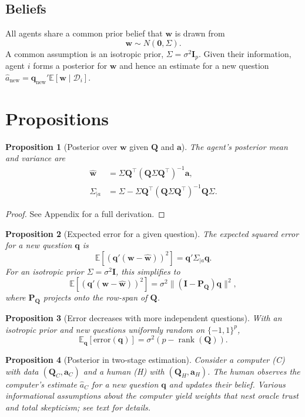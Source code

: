\documentclass[11pt]{article}
\newtheorem{prop}{Proposition}
\begin{document}
\subsection*{Beliefs}
All agents share a common prior belief that $\bm{w}$ is drawn from
$$\bm{w} \sim N(\bm{0}, \Sigma).$$
A common assumption is an isotropic prior, $\Sigma = \sigma^2 \bm{I}_p$. Given their information, agent $i$ forms a posterior for $\bm{w}$ and hence an estimate for a new question $\hat{a}_{\text{new}} = \bm{q}_{\text{new}}' \mathbb{E}[\bm{w} \mid \mathcal{D}_i]$.

\section{Propositions}

\begin{prop}[Posterior over $\bm{w}$ given $\bm{Q}$ and $\bm{a}$]\label{prop:posterior}
The agent's posterior mean and variance are
\begin{align*}
      \hat{\bm w}&= \Sigma \bm{Q}^{\top}(\bm{Q}\Sigma \bm{Q}^{\top})^{-1}\bm a,\\
      \Sigma_{\mid a} &=\Sigma-\Sigma \bm{Q}^{\top}(\bm{Q}\Sigma \bm{Q}^{\top})^{-1}\bm{Q}\Sigma.
\end{align*}
\end{prop}

\begin{proof}
See Appendix for a full derivation.
\end{proof}

\begin{prop}[Expected error for a given question]\label{prop:error}
The expected squared error for a new question $\bm q$ is
$$\mathbb{E}[(\bm q'(\bm w - \hat{\bm w}))^2] = \bm q' \Sigma_{\mid a} \bm q.$$ 
For an isotropic prior $\Sigma = \sigma^2 \bm{I}$, this simplifies to
$$\mathbb{E}[(\bm q'(\bm w - \hat{\bm w}))^2] = \sigma^2 \|(\bm{I}-\bm{P_Q})\bm q\|^2,$$
where $\bm{P_Q}$ projects onto the row-span of $\bm{Q}$.
\end{prop}

\begin{prop}[Error decreases with more independent questions]\label{prop:error-average}
With an isotropic prior and new questions uniformly random on $\{-1,1\}^p$,
$$\mathbb{E}_{\bm{q}}[\text{error}(\bm{q})] = \sigma^2 (p - \operatorname{rank}(\bm{Q})).$$
\end{prop}

\begin{prop}[Posterior in two-stage estimation]\label{prop:twostage}
Consider a computer (C) with data $(\bm{Q}_C, \bm{a}_C)$ and a human (H) with $(\bm{Q}_H, \bm{a}_H)$. The human observes the computer's estimate $\hat{a}_C$ for a new question $\bm q$ and updates their belief. Various informational assumptions about the computer yield weights that nest oracle trust and total skepticism; see text for details.
\end{prop}
\end{document}
